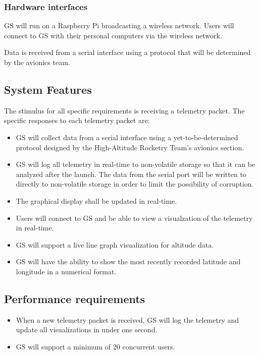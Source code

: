 \documentclass[10pt,draftclsnofoot,onecolumn]{IEEEtran}
\begin{document}
	\subsubsection{Hardware interfaces}
	GS will run on a Raspberry Pi broadcasting a wireless network. Users will connect to GS with their personal computers
	via the wireless network.

	Data is received from a serial interface using a protocol that will be determined by the avionics team.

	\subsection{System Features}

	The stimulus for all specific requirements is receiving a telemetry packet. The specific responses to each telemetry packet are:
	\begin{itemize}
		\item GS will collect data from a serial interface using a yet-to-be-determined protocol designed by the High-Altitude Rocketry Team's avionics section.
		\item GS will log all telemetry in real-time to non-volatile storage so that it can be analyzed
		after the launch.
		The data from the serial port will be written to directly to non-volatile storage in order to limit
		the possibility of corruption.
		\item The graphical display shall be updated in real-time.
		\item Users will connect to GS and be able to view a visualzation of the telemetry in real-time.
		\item GS will support a live line graph visualization for altitude data.
		\item GS will have the ability to show the most recently recorded latitude and longitude in a numerical format.
	\end{itemize}

	\subsection{Performance requirements}

	\begin{itemize}
		\item When a new telemetry packet is received, GS will log the telemetry and update all visualizations in under one second.
		\item GS will support a minimum of 20 concurrent users.
	\end{itemize}
\end{document}
